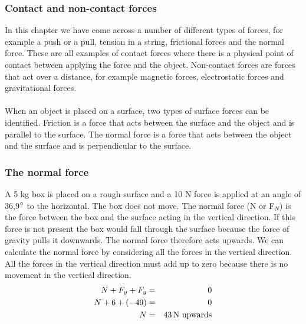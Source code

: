 \subsubsection{Contact and non-contact forces}
In this chapter we have come across a number of different types of forces, for example a push or a pull, tension in a string, frictional forces and the normal force. These are all examples of contact forces where there is a physical point of contact between applying the force and the object. Non-contact forces are forces that act over a distance, for example magnetic forces, electrostatic forces and gravitational forces.\\
\\
When an object is placed on a surface, two types of surface forces can be identified. Friction is a force that acts between the surface and the object and is parallel to the surface. The normal force is a force that acts between the object and the surface and is perpendicular to the surface.\\

\subsubsection{The normal force}
A 5 kg box is placed on a rough surface and a 10 N force is applied at an angle of 36,9$^{\circ}$ to the horizontal. The box does not move. The normal force (N or F$_N$) is the force between the box and the surface acting in the vertical direction. If this force is not present the box would fall through the surface because the force of gravity pulls it downwards. The normal force therefore acts upwards. We can calculate the normal force by considering all the forces in the vertical direction. All the forces in the vertical direction must add up to zero because there is no movement in the vertical direction.
\begin{eqnarray*}
N + F_y + F_g &=& 0\\
N + 6 + (-49) &=& 0\\
N &=& 43 \,\rm{N}~ \mbox{upwards}
\end{eqnarray*}

